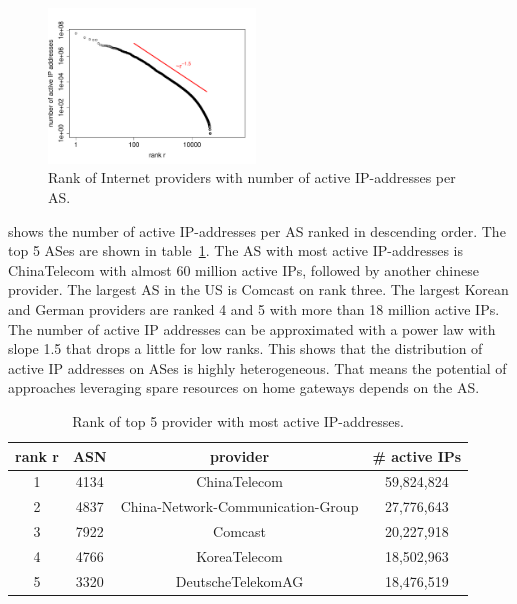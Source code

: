 \begin{figure}[tb]
\centering
\includegraphics[width=0.49\textwidth]{aslevel/census/figs/asrank}
\caption{Rank of Internet providers with number of active IP-addresses per AS.}
\label{fig:asrank}
\end{figure}

 shows the number of active IP-addresses per AS ranked in descending order.
The top 5 ASes are shown in table~\ref{tab:asrank}.
The AS with most active IP-addresses is ChinaTelecom with almost 60 million active IPs, followed by another chinese provider.
The largest AS in the US is Comcast on rank three.
The largest Korean and German providers are ranked 4 and 5 with more than 18 million active IPs.
The number of active IP addresses can be approximated with a power law with slope 1.5 that drops a little for low ranks.
This shows that the distribution of active IP addresses on ASes is highly heterogeneous.
That means the potential of approaches leveraging spare resources on home gateways depends on the AS.

\begin{table}[tb]
\centering
\caption{Rank of top 5 provider with most active IP-addresses.}
\label{tab:asrank}
\begin{tabular}{|c|c|c|c|}
\hline 
rank r & ASN & provider & \# active IPs  \\ 
\hline 
1 & 4134 & ChinaTelecom & 59,824,824 \\ 
2 & 4837 & China-Network-Communication-Group & 27,776,643 \\ 
3 & 7922 & Comcast & 20,227,918 \\ 
4 & 4766 & KoreaTelecom & 18,502,963 \\
5 & 3320 & DeutscheTelekomAG & 18,476,519 \\
\hline 
\end{tabular}
\end{table}

%
%
% 
